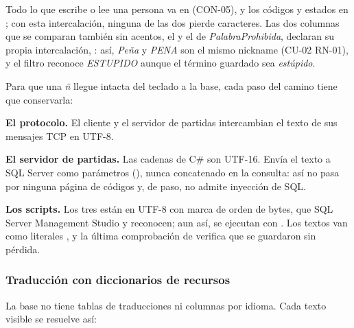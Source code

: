 Todo lo que escribe o lee una persona va en  (\mbox{CON-05}), y los códigos y estados en ; con esta intercalación, ninguna de las dos pierde caracteres. Las dos columnas que se comparan también sin acentos, el  y el  de \textit{PalabraProhibida}, declaran su propia intercalación, : así, \textit{Peña} y \textit{PENA} son el mismo nickname (\mbox{CU-02} \mbox{RN-01}), y el filtro reconoce \textit{ESTUPIDO} aunque el término guardado sea \textit{estúpido}.

Para que una \textit{ñ} llegue intacta del teclado a la base, cada paso del camino tiene que conservarla:

\begin{reglas}
  \item \textbf{El protocolo.} El cliente y el servidor de partidas intercambian el texto de sus mensajes TCP en UTF-8.
  \item \textbf{El servidor de partidas.} Las cadenas de C\# son UTF-16. Envía el texto a SQL Server como parámetros  (), nunca concatenado en la consulta: así no pasa por ninguna página de códigos y, de paso, no admite inyección de SQL.
  \item \textbf{Los scripts.} Los tres están en UTF-8 con marca de orden de bytes, que SQL Server Management Studio y  reconocen; aun así, se ejecutan con . Los textos van como literales , y la última comprobación de  verifica que se guardaron sin pérdida.
\end{reglas}

\subsubsection*{Traducción con diccionarios de recursos}

La base no tiene tablas de traducciones ni columnas por idioma. Cada texto visible se resuelve así:

